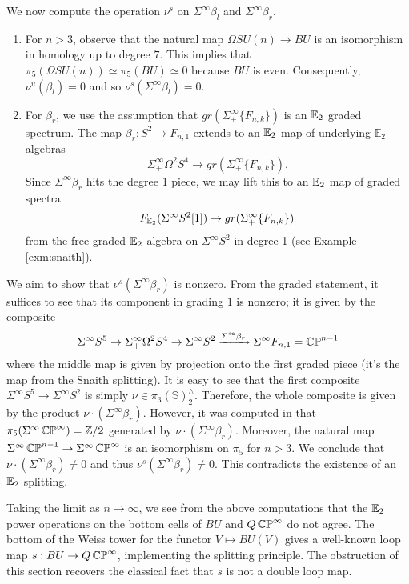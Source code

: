 We now compute the operation $\nu^s$ on $\Sigma^{\infty} \beta_l$ and $\Sigma^{\infty} \beta_r$.  
\begin{enumerate}
\item For $n>3$, observe that the natural map $\Omega SU(n) \to BU$ is an isomorphism in homology up to degree $7$.  This implies that $\pi_5(\Omega SU(n)) \simeq \pi_5(BU) \simeq 0$ because $BU$ is even.  Consequently, $\nu^u(\beta_l) = 0$ and so $\nu^s(\Sigma^{\infty} \beta_l) = 0.$  

\item For $\beta_r$, we use the assumption that $gr(\Sigma^{\infty}_+ \{ F_{n,k} \})$ is an $\operatorname{\mathbb{E}}_2$ graded spectrum.  The map $\beta_r: S^2 \to F_{n,1}$ extends to an $\operatorname{\mathbb{E}}_2$ map of underlying $\mathbb{E}_2$-algebras $$\Sigma^{\infty}_+ \Omega^2 S^4 \to  gr(\Sigma^{\infty}_+ \{ F_{n,k} \}).$$  Since $\Sigma^{\infty} \beta_r$ hits the degree 1 piece, we may lift this to an $\operatorname{\mathbb{E}}_2$ map of graded spectra $$F_{\operatorname{\mathbb{E}}_2}(\Sigma^\infty S^2[1]) \to gr(\Sigma^{\infty}_+ \{ F_{n,k} \})$$ from the free graded $\operatorname{\mathbb{E}}_2$ algebra on $\Sigma^{\infty} S^2$ in degree 1 (see Example \ref{exm:snaith}).
\end{enumerate}

We aim to show that $\nu^s(\Sigma^\infty \beta_r)$ is nonzero.  From the graded statement, it suffices to see that its component in grading $1$ is nonzero; it is given by the composite $$\Sigma^{\infty} S^5 \to \Sigma^{\infty}_+ \Omega^2 S^4 \to \Sigma^{\infty} S^2 \xrightarrow{\Sigma^{\infty} \beta_r} \Sigma^{\infty} F_{n,1} = \operatorname{\mathbb{CP}}^{n-1}$$ where the middle map is given by projection onto the first graded piece (it's the map from the Snaith splitting).  It is easy to see that the first composite $\Sigma^{\infty} S^5 \to \Sigma^{\infty} S^2$ is simply $\nu \in \pi_3(\mathbb{S})^{\wedge}_2.$  Therefore, the whole composite is given by the product $\nu\cdot (\Sigma^{\infty} \beta_r).$  
However, it was computed in \cite[Theorem II.8]{Liulevicius} that $\pi_5(\Sigma^{\infty}\operatorname{\mathbb{CP}}^{\infty})=\mathbb{Z}/2$ generated by $\nu \cdot (\Sigma^{\infty}\beta_r).$  Moreover, the natural map $\Sigma^{\infty}\operatorname{\mathbb{CP}}^{n-1} \to \Sigma^{\infty}\operatorname{\mathbb{CP}}^\infty$ is an isomorphism on $\pi_5$ for $n>3$.  We conclude that $\nu \cdot (\Sigma^{\infty}\beta_r )\neq 0$ and thus $\nu^s(\Sigma^{\infty} \beta_r) \neq 0$.  This contradicts the existence of an $\operatorname{\mathbb{E}}_2$ splitting.   


\begin{rmk}
Taking the limit as $n\to\infty$, we see from the above computations that the $\operatorname{\mathbb{E}}_2$ power operations on the bottom cells of $BU$ and $Q\operatorname{\mathbb{CP}}^{\infty}$ do not agree.  The bottom of the Weiss tower for the functor $V \mapsto BU(V)$ gives a well-known loop map $s:BU \to Q\operatorname{\mathbb{CP}}^{\infty}$, implementing the splitting principle.  The obstruction of this section recovers the classical fact that $s$ is not a double loop map.
\end{rmk}

